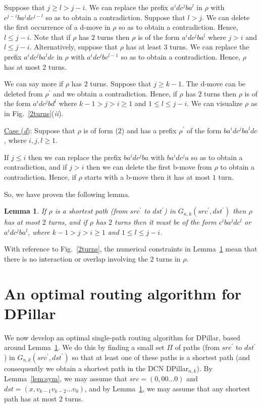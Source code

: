\documentclass{article}
\newtheorem{lemma}[definition]{Lemma}
\begin{document}
Suppose that $j \geq l > j-i$. We can replace the prefix $a^idc^jba^l$ in $\rho$ with $c^{j-i}ba^jdc^{j-l}$ so as to obtain a contradiction. Suppose that $l > j$. We can delete the first occurrence of a d-move in $\rho$ so as to obtain a contradiction. Hence, $l \leq j-i$. Note that if $\rho$ has $2$ turns then $\rho$ is of the form $a^idc^jba^l$ where $j > i$ and $l \leq j-i$. Alternatively, suppose that $\rho$ has at least $3$ turns. We can replace the prefix $a^idc^jba^ldc$ in $\rho$ with $a^idc^jbc^{l-1}$ so as to obtain a contradiction. Hence, $\rho$ has at most $2$ turns.

We can say more if $\rho$ has $2$ turns. Suppose that $j\geq k-1$. The d-move can be deleted from $\rho^\prime$ and we obtain a contradiction. Hence, if $\rho$ has $2$ turns then $\rho$ is of the form $a^idc^jbd^l$ where $k-1>j >i\geq 1$ and $1 \leq l \leq j-i$. We can visualize $\rho$ as in Fig.~\ref{2turns}(\emph{ii\/}).\smallskip

\noindent\underline{Case (\emph{d\/})}: Suppose that $\rho$ is of form (2) and has a prefix $\rho^\prime$ of the form $ba^idc^jba^ldc$, where $i,j,l\geq 1$.\smallskip

\noindent If $j\leq i$ then we can replace the prefix $ba^idc^jba$ with $ba^idc^ja$ so as to obtain a contradiction, and if $j > i$ then we can delete the first b-move from $\rho$ to obtain a contradiction. Hence, if $\rho$ starts with a b-move then it has at most $1$ turn.\smallskip

So, we have proven the following lemma.

\begin{lemma}\label{lem:turns}If $\rho$ is a shortest path (from $src^\prime$ to $dst^\prime$) in $G_{n,k}(src^\prime,dst^\prime)$ then $\rho$ has at most $2$ turns, and if $\rho$ has $2$ turns then it must be of the form $c^iba^jdc^l$ or $a^idc^jba^l$, where $k-1 > j > i \geq 1$ and $1 \leq l\leq j-i$.
\end{lemma}

With reference to Fig.~\ref{2turns}, the numerical constraints in Lemma~\ref{lem:turns} mean that there is no interaction or overlap involving the $2$ turns in $\rho$.

\section{An optimal routing algorithm for DPillar}\label{sec:algorithm}

We now develop an optimal single-path routing algorithm for DPillar, based around Lemma~\ref{lem:turns}. We do this by finding a small set $\Pi$ of paths (from $src^\prime$ to $dst^\prime$) in $G_{n,k}(src^\prime,dst^\prime)$ so that at least one of these paths is a shortest path (and consequently we obtain a shortest path in the DCN DPillar$_{n,k}$). By Lemma~\ref{lem:sym}, we may assume that $src=(0,00\ldots0)$ and $dst=(x,v_{k-1}v_{k-2}\ldots v_0)$, and by Lemma~\ref{lem:turns}, we may assume that any shortest path has at most $2$ turns.
\end{document}
